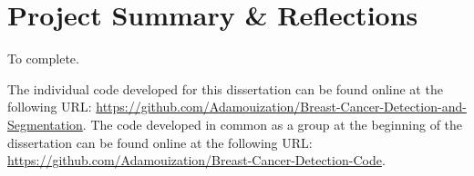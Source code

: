
\section{Project Summary \& Reflections}

To complete.

The individual code developed for this dissertation can be found online at the following URL: \url{https://github.com/Adamouization/Breast-Cancer-Detection-and-Segmentation}. The code developed in common as a group at the beginning of the dissertation can be found online at the following URL: \url{https://github.com/Adamouization/Breast-Cancer-Detection-Code}.